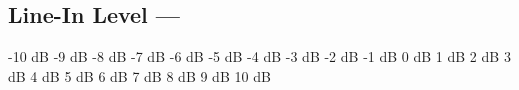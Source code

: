 \subsection[Line-In Level]{Line-In Level --- \UiKey{\SET}}































-10 dB 
-9 dB
-8 dB
-7 dB
-6 dB
-5 dB
-4 dB
-3 dB
-2 dB
-1 dB
0 dB
1 dB
2 dB
3 dB
4 dB
5 dB
6 dB
7 dB
8 dB
9 dB
10 dB
